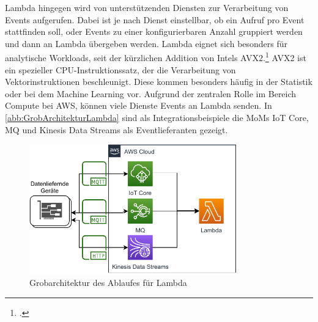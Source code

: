 Lambda hingegen wird von unterstützenden Diensten zur Verarbeitung von Events aufgerufen. 
Dabei ist je nach Dienst einstellbar, ob ein Aufruf pro Event stattfinden soll, oder Events zu einer konfigurierbaren Anzahl gruppiert werden und dann an Lambda übergeben werden. Lambda eignet sich besonders für analytische Workloads, seit der kürzlichen Addition von Intels \ac{AVX2}.\footcite[Vgl. auch im Folgenden][]{Beswick.24.11.2020} \ac{AVX2} ist ein spezieller CPU-Instruktionssatz, der die Verarbeitung von Vektorinstruktionen beschleunigt. Diese kommen besonders häufig in der Statistik oder bei dem Machine Learning vor. 
Aufgrund der zentralen Rolle im Bereich Compute bei \ac{AWS}, können viele Dienste Events an Lambda senden. In \autoref{abb:GrobArchitekturLambda} sind als Integrationsbeispiele die \acp{MoM} \ac{IoT} Core, MQ und Kinesis Data Streams als Eventlieferanten gezeigt.
\begin{figure}[H]
\centering
\includegraphics[width=0.8\textwidth]{graphics/Lambda-general.pdf}
\caption{Grobarchitektur des Ablaufes für Lambda}
\label{abb:GrobArchitekturLambda}
\end{figure}

